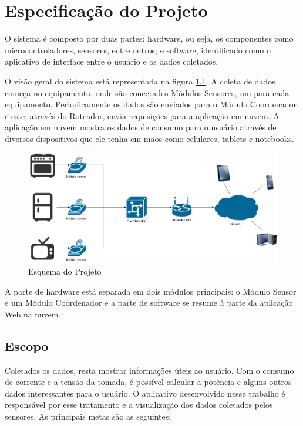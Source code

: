 \chapter{Especificação do Projeto}
\label{Cap:especificacao}

O sistema é composto por duas partes: hardware, ou seja, os componentes como microcontroladores, sensores, entre outros; e software, identificado como o aplicativo de interface entre o usuário e os dados coletados.

O visão geral do sistema está representada na figura \ref{fig:esqueminha}. A coleta de dados começa no equipamento, onde são conectados Módulos Sensores, um para cada equipamento. Periodicamente os dados são enviados para o Módulo Coordenador, e este, através do Roteador, envia requisições para a aplicação em nuvem. A aplicação em nuvem mostra os dados de consumo para o usuário através de diversos dispositivos que ele tenha em mãos como celulares, tablets e notebooks.

\begin{figure}[H]
\centering
\includegraphics[width=1\textwidth]{figuras/esqueminha.png}
\caption{\label{fig:esqueminha} Esquema do Projeto}
\end{figure}

A parte de hardware está separada em dois módulos principais: o Módulo Sensor e um Módulo Coordenador e a parte de software se resume à parte da aplicação Web na nuvem.



\section{Escopo}

Coletados os dados, resta mostrar informações úteis ao usuário. Com o consumo de corrente e a tensão da tomada, é possível calcular a potência e alguns outros dados interessantes para o usuário. O aplicativo desenvolvido nesse trabalho é responsável por esse tratamento e a visualização dos dados coletados pelos sensores. As principais metas são as seguintes:

